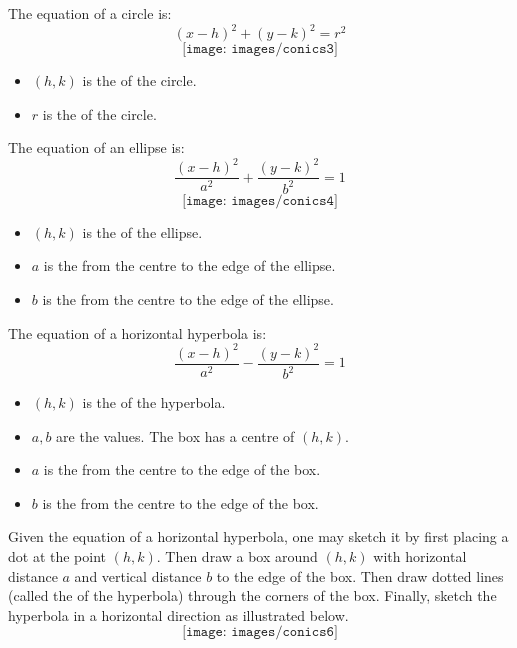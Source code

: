 \bigskip\noindent
{} The equation of a circle is:
$$(x-h)^2+(y-k)^2=r^2$$
$$\texttt{[image: images/conics3]}$$
\begin{multicols}{2}
\begin{itemize}
	\item $(h,k)$ is the  of the circle.
	\item  $r$ is the  of the circle.
\end{itemize}
\end{multicols}

\bigskip\noindent
{} The equation of an ellipse is:
$$\frac{(x-h)^2}{a^2}+\frac{(y-k)^2}{b^2}=1$$
$$\texttt{[image: images/conics4]}$$
\begin{itemize}
	\item $(h,k)$ is the  of the ellipse.
	\item $a$ is the  from the centre to the edge of the ellipse.
	\item $b$ is the  from the centre to the edge of the ellipse.
\end{itemize}

\bigskip\noindent
{} The equation of a horizontal hyperbola is:
$$\frac{(x-h)^2}{a^2}-\frac{(y-k)^2}{b^2}=1$$
\begin{multicols}{2}
\begin{itemize}
	\item $(h,k)$ is the  of the hyperbola.
	\item $a,b$ are the  values. The box has a centre of $(h,k)$.
	\item $a$ is the  from the centre to the edge of the box.
	\item $b$ is the  from the centre to the edge of the box.
\end{itemize}
\end{multicols}
Given the equation of a horizontal hyperbola, one may sketch it by first placing a dot at 
the point $(h,k)$. Then draw a box around $(h,k)$ with horizontal distance $a$ and vertical distance $b$ to the edge of the box. Then draw dotted lines (called the  of the hyperbola) through the corners of the box. Finally, sketch the hyperbola in a horizontal direction as illustrated below.
$$\texttt{[image: images/conics6]}$$

